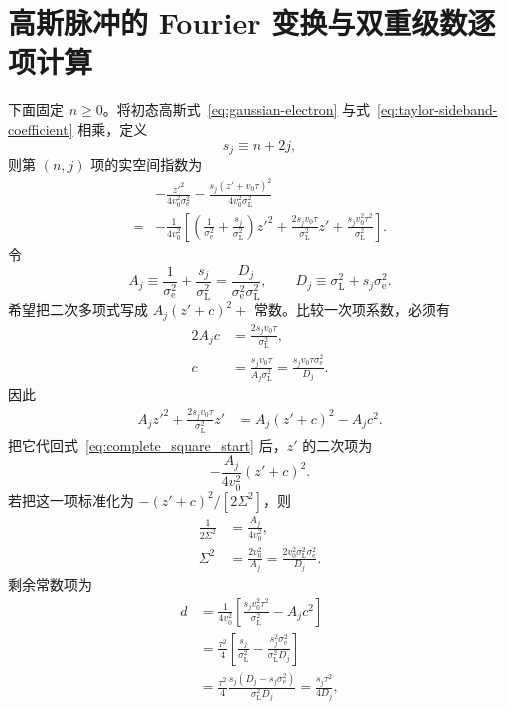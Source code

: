 \section{高斯脉冲的 Fourier 变换与双重级数逐项计算}
下面固定 \(n\ge0\)。将初态高斯式~\eqref{eq:gaussian-electron} 与式~\eqref{eq:taylor-sideband-coefficient} 相乘，定义
\begin{equation}
s_j\equiv n+2j,
\end{equation}
则第 \((n,j)\) 项的实空间指数为
\begin{align}
&-\frac{z'^2}{4v_0^2\sigma_{\mathrm e}^2}
-\frac{s_j(z'+v_0\tau)^2}{4v_0^2\sigma_{\mathrm L}^2}\\
={}&-\frac{1}{4v_0^2}
\left[
\left(\frac{1}{\sigma_{\mathrm e}^2}+\frac{s_j}{\sigma_{\mathrm L}^2}\right)z'^2
+\frac{2s_jv_0\tau}{\sigma_{\mathrm L}^2}z'
+\frac{s_jv_0^2\tau^2}{\sigma_{\mathrm L}^2}
\right].
\label{eq:complete_square_start}
\end{align}
令
\begin{equation}
A_j\equiv \frac{1}{\sigma_{\mathrm e}^2}+\frac{s_j}{\sigma_{\mathrm L}^2}
=\frac{D_j}{\sigma_{\mathrm e}^2\sigma_{\mathrm L}^2},
\qquad
D_j\equiv\sigma_{\mathrm L}^2+s_j\sigma_{\mathrm e}^2.
\label{eq:Aj-Dj-def}
\end{equation}
希望把二次多项式写成 $A_j(z'+c)^2+$ 常数。比较一次项系数，必须有
\begin{align}
2A_jc
&=\frac{2s_jv_0\tau}{\sigma_{\mathrm L}^2},\\
c
&=\frac{s_jv_0\tau}{A_j\sigma_{\mathrm L}^2}
=\frac{s_jv_0\tau\sigma_{\mathrm e}^2}{D_j}.
\end{align}
因此
\begin{align}
A_j z'^2+\frac{2s_jv_0\tau}{\sigma_{\mathrm L}^2}z'
&=A_j(z'+c)^2-A_jc^2.
\end{align}
把它代回式~\eqref{eq:complete_square_start} 后，$z'$ 的二次项为
\begin{equation}
-\frac{A_j}{4v_0^2}(z'+c)^2.
\end{equation}
若把这一项标准化为 $-(z'+c)^2/[2\Sigma^2]$，则
\begin{align}
\frac{1}{2\Sigma^2}&=\frac{A_j}{4v_0^2},\\
\Sigma^2&=\frac{2v_0^2}{A_j}
=\frac{2v_0^2\sigma_{\mathrm L}^2\sigma_{\mathrm e}^2}{D_j}.
\end{align}
剩余常数项为
\begin{align}
d
&=\frac{1}{4v_0^2}
\left[
\frac{s_jv_0^2\tau^2}{\sigma_{\mathrm L}^2}-A_jc^2
\right]\\
&=\frac{\tau^2}{4}
\left[
\frac{s_j}{\sigma_{\mathrm L}^2}
-\frac{s_j^2\sigma_{\mathrm e}^2}{\sigma_{\mathrm L}^2D_j}
\right]\\
&=\frac{\tau^2}{4}
\frac{s_j(D_j-s_j\sigma_{\mathrm e}^2)}{\sigma_{\mathrm L}^2D_j}
=\frac{s_j\tau^2}{4D_j},
\end{align}
